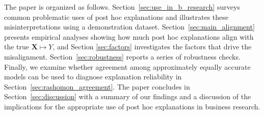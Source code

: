 \documentclass[11pt]{article}
\begin{document}
  The paper is organized as follows. %
  Section~\ref{sec:use_in_b_research} surveys common problematic uses of post hoc explanations and illustrates these misinterpretations using a demonstration dataset.
Section~\ref{sec:main_alignment} presents empirical analyses showing how much post hoc explanations align with the true $\mathbf{X}\mapsto Y$, and Section \ref{sec:factors} investigates the factors that drive the misalignment. Section~\ref{sec:robustness} reports a series of robustness checks.
Finally, we examine whether agreement among approximately equally accurate models can be used to diagnose explanation reliability in Section~\ref{sec:rashomon_agreement}. The paper concludes in Section~\ref{sec:discussion} with a summary of our findings and a discussion of the implications for the appropriate use of post hoc explanations in business research.






\end{document}
